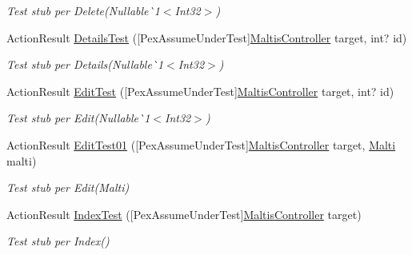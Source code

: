 \begin{DoxyCompactItemize}
\begin{DoxyCompactList}\small\item\em Test stub per Delete(Nullable\`{}1$<$Int32$>$)\end{DoxyCompactList}\item 
Action\+Result \mbox{\hyperlink{class_brew_day2_1_1_controllers_1_1_tests_1_1_maltis_controller_test_ac97cdcc1ec15f313b4741db9bed61b91}{Details\+Test}} (\mbox{[}Pex\+Assume\+Under\+Test\mbox{]}\mbox{\hyperlink{class_brew_day2_1_1_controllers_1_1_maltis_controller}{Maltis\+Controller}} target, int? id)
\begin{DoxyCompactList}\small\item\em Test stub per Details(Nullable\`{}1$<$Int32$>$)\end{DoxyCompactList}\item 
Action\+Result \mbox{\hyperlink{class_brew_day2_1_1_controllers_1_1_tests_1_1_maltis_controller_test_af474a0fe9e14ab702b71dfe31b3861ac}{Edit\+Test}} (\mbox{[}Pex\+Assume\+Under\+Test\mbox{]}\mbox{\hyperlink{class_brew_day2_1_1_controllers_1_1_maltis_controller}{Maltis\+Controller}} target, int? id)
\begin{DoxyCompactList}\small\item\em Test stub per Edit(Nullable\`{}1$<$Int32$>$)\end{DoxyCompactList}\item 
Action\+Result \mbox{\hyperlink{class_brew_day2_1_1_controllers_1_1_tests_1_1_maltis_controller_test_a351bcdc1cd26b01047cd9a2de6eec49e}{Edit\+Test01}} (\mbox{[}Pex\+Assume\+Under\+Test\mbox{]}\mbox{\hyperlink{class_brew_day2_1_1_controllers_1_1_maltis_controller}{Maltis\+Controller}} target, \mbox{\hyperlink{class_brew_day2_1_1_models_1_1_malti}{Malti}} malti)
\begin{DoxyCompactList}\small\item\em Test stub per Edit(\+Malti)\end{DoxyCompactList}\item 
Action\+Result \mbox{\hyperlink{class_brew_day2_1_1_controllers_1_1_tests_1_1_maltis_controller_test_ad741e97be58668a8244776ae96ca6105}{Index\+Test}} (\mbox{[}Pex\+Assume\+Under\+Test\mbox{]}\mbox{\hyperlink{class_brew_day2_1_1_controllers_1_1_maltis_controller}{Maltis\+Controller}} target)
\begin{DoxyCompactList}\small\item\em Test stub per Index()\end{DoxyCompactList}\end{DoxyCompactItemize}


